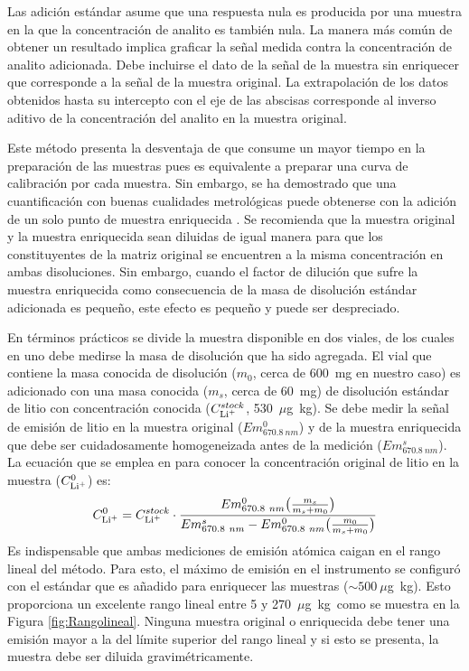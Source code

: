 Las adición estándar asume que una respuesta nula es producida por una muestra en la que la concentración de analito es también nula. La manera más común de obtener un resultado implica graficar la señal medida contra la concentración de analito adicionada. Debe incluirse el dato de la señal de la muestra sin enriquecer que corresponde a la señal de la muestra original. La extrapolación de los datos obtenidos hasta su intercepto con el eje de las abscisas corresponde al inverso aditivo de la concentración del analito en la muestra original.

Este método presenta la desventaja de que consume un mayor tiempo en la preparación de las muestras pues es equivalente a preparar una curva de calibración por cada muestra. Sin embargo, se ha demostrado que una cuantificación con buenas cualidades metrológicas puede obtenerse con la adición de un solo punto de muestra enriquecida \citep{Ellison2008}. Se recomienda que la muestra original y la muestra enriquecida sean diluidas de igual manera para que los constituyentes de la matriz original se encuentren a la misma concentración en ambas disoluciones. Sin embargo, cuando el factor de dilución que sufre la muestra enriquecida como consecuencia de la masa de disolución estándar adicionada es pequeño, este efecto es pequeño y puede ser despreciado.

En términos prácticos se divide la muestra disponible en dos viales, de los cuales en uno debe medirse la masa de disolución que ha sido agregada. El vial que contiene la masa conocida de disolución ($m_0$, cerca de 600~mg en nuestro caso) es adicionado con una masa conocida ($m_s$, cerca de 60~mg) de disolución estándar de litio con concentración conocida ($C_{\ce{Li+}}^{stock}$, 530~$\mu$g~kg\mnn). Se debe medir la señal de emisión de litio en la muestra original ($Em_{670.8~nm}^0$) y de la muestra enriquecida que debe ser cuidadosamente homogeneizada antes de la medición ($Em_{670.8~nm}^s$). La ecuación que se emplea en para conocer la concentración original de litio en la muestra ($C_{\ce{Li+}}^0$) es:
\begin{equation}
    C_{\ce{Li+}}^0 = C_{\ce{Li+}}^{stock} \cdot\frac{Em_{670.8~nm}^0  \big(\frac{m_s}{m_s+m_0}\big)} {Em_{670.8~nm}^s-Em_{670.8~nm}^0\big(\frac{m_0}{m_s+m_0}\big)}
\end{equation}
Es indispensable que ambas mediciones de emisión atómica caigan en el rango lineal del método. Para esto, el máximo de emisión en el instrumento se configuró con el estándar que es añadido para enriquecer las muestras ($\sim500~\mu$g~kg\mnn). Esto proporciona un excelente rango lineal entre 5 y 270~$\mu$g~kg\mnn\ como se muestra en la Figura \ref{fig:Rangolineal}. Ninguna muestra original o enriquecida debe tener una emisión mayor a la del límite superior del rango lineal y si esto se presenta, la muestra debe ser diluida gravimétricamente.

